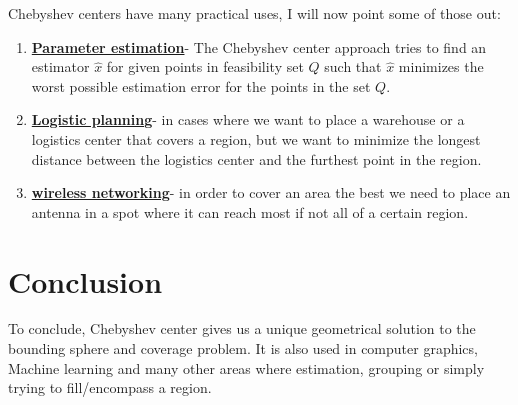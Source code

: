 \documentclass[]{article}
\newcommand{\Q}[0]{\textit{Q}}
\begin{document}
Chebyshev centers have many practical uses, I will now point some of those out:
\begin{enumerate}
	\item \underline{\textbf{Parameter estimation}}\cite{doi:10.1137/060656784}\cite{4471880}- The Chebyshev center approach tries to find an estimator $\hat{x}$ for given points in feasibility set $\Q$ such that $\hat{x}$ minimizes the worst possible estimation error for the points in the set $\Q$.
	\item \underline{\textbf{Logistic planning}}- in cases where we want to place a warehouse or a logistics center that covers a region, but we want to minimize the longest distance between the logistics center and the furthest point in the region.
	\item \underline{\textbf{wireless networking}}- in order to cover an area the best we need to place an antenna in a spot where it can reach most if not all of a certain region.
\end{enumerate}

\section{Conclusion}
To conclude, Chebyshev center gives us a unique geometrical solution to the bounding sphere and coverage problem. It is also used in computer graphics, Machine learning and many other areas where estimation, grouping or simply trying to fill/encompass a region.



\printbibliography[
heading=bibintoc,
title={References}
]
\end{document}
